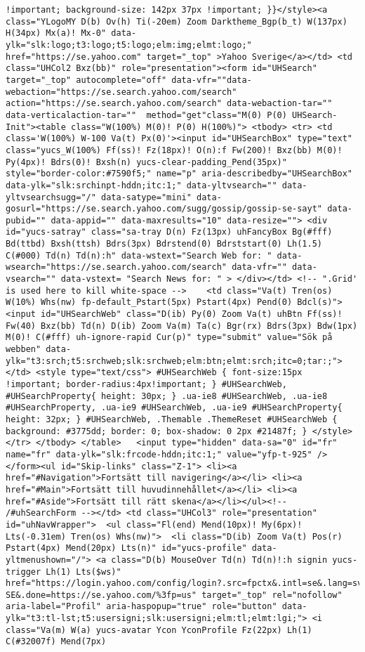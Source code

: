\begin{verbatim}
!important; background-size: 142px 37px !important; }}</style><a class="YLogoMY D(b) Ov(h) Ti(-20em) Zoom Darktheme_Bgp(b_t) W(137px) H(34px) Mx(a)! Mx-0" data-ylk="slk:logo;t3:logo;t5:logo;elm:img;elmt:logo;" href="https://se.yahoo.com" target="_top" >Yahoo Sverige</a></td> <td class="UHCol2 Bxz(bb)" role="presentation"><form id="UHSearch" target="_top" autocomplete="off" data-vfr=""data-webaction="https://se.search.yahoo.com/search" action="https://se.search.yahoo.com/search" data-webaction-tar="" data-verticalaction-tar=""  method="get"class="M(0) P(0) UHSearch-Init"><table class="W(100%) M(0)! P(0) H(100%)"> <tbody> <tr> <td class='W(100%) W-100 Va(t) Px(0)'><input id="UHSearchBox" type="text" class="yucs_W(100%) Ff(ss)! Fz(18px)! O(n):f Fw(200)! Bxz(bb) M(0)! Py(4px)! Bdrs(0)! Bxsh(n) yucs-clear-padding_Pend(35px)" style="border-color:#7590f5;" name="p" aria-describedby="UHSearchBox" data-ylk="slk:srchinpt-hddn;itc:1;" data-yltvsearch="" data-yltvsearchsugg="/" data-satype="mini" data-gosurl="https://se.search.yahoo.com/sugg/gossip/gossip-se-sayt" data-pubid="" data-appid="" data-maxresults="10" data-resize=""> <div id="yucs-satray" class="sa-tray D(n) Fz(13px) uhFancyBox Bg(#fff) Bd(ttbd) Bxsh(ttsh) Bdrs(3px) Bdrstend(0) Bdrststart(0) Lh(1.5) C(#000) Td(n) Td(n):h" data-wstext="Search Web for: " data-wsearch="https://se.search.yahoo.com/search" data-vfr="" data-vsearch="" data-vstext= "Search News for: " > </div></td> <!-- ".Grid' is used here to kill white-space -->    <td class="Va(t) Tren(os) W(10%) Whs(nw) fp-default_Pstart(5px) Pstart(4px) Pend(0) Bdcl(s)"><input id="UHSearchWeb" class="D(ib) Py(0) Zoom Va(t) uhBtn Ff(ss)! Fw(40) Bxz(bb) Td(n) D(ib) Zoom Va(m) Ta(c) Bgr(rx) Bdrs(3px) Bdw(1px) M(0)! C(#fff) uh-ignore-rapid Cur(p)" type="submit" value="Sök på webben" data-ylk="t3:srch;t5:srchweb;slk:srchweb;elm:btn;elmt:srch;itc=0;tar:;"></td> <style type="text/css"> #UHSearchWeb { font-size:15px !important; border-radius:4px!important; } #UHSearchWeb, #UHSearchProperty{ height: 30px; } .ua-ie8 #UHSearchWeb, .ua-ie8 #UHSearchProperty, .ua-ie9 #UHSearchWeb, .ua-ie9 #UHSearchProperty{ height: 32px; } #UHSearchWeb, .Themable .ThemeReset #UHSearchWeb { background: #3775dd; border: 0; box-shadow: 0 2px #21487f; } </style>  </tr> </tbody> </table>   <input type="hidden" data-sa="0" id="fr" name="fr" data-ylk="slk:frcode-hddn;itc:1;" value="yfp-t-925" />    </form><ul id="Skip-links" class="Z-1"> <li><a href="#Navigation">Fortsätt till navigering</a></li> <li><a href="#Main">Fortsätt till huvudinnehållet</a></li> <li><a href="#Aside">Fortsätt till rätt skena</a></li></ul><!-- /#uhSearchForm --></td> <td class="UHCol3" role="presentation" id="uhNavWrapper">  <ul class="Fl(end) Mend(10px)! My(6px)! Lts(-0.31em) Tren(os) Whs(nw)">  <li class="D(ib) Zoom Va(t) Pos(r) Pstart(4px) Mend(20px) Lts(n)" id="yucs-profile" data-yltmenushown="/"> <a class="D(b) MouseOver Td(n) Td(n)!:h signin yucs-trigger Lh(1) Lts($ws)" href="https://login.yahoo.com/config/login?.src=fpctx&.intl=se&.lang=sv-SE&.done=https://se.yahoo.com/%3fp=us" target="_top" rel="nofollow" aria-label="Profil" aria-haspopup="true" role="button" data-ylk="t3:tl-lst;t5:usersigni;slk:usersigni;elm:tl;elmt:lgi;"> <i class="Va(m) W(a) yucs-avatar Ycon YconProfile Fz(22px) Lh(1) C(#32007f) Mend(7px) 
\end{verbatim}
